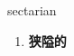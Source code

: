 
\begin{frame}
{\huge sectarian}
\begin{center}
\begin{enumerate}\Large
  \item \textbf{狭隘的}
\end{enumerate}
\end{center}
\end{frame}
